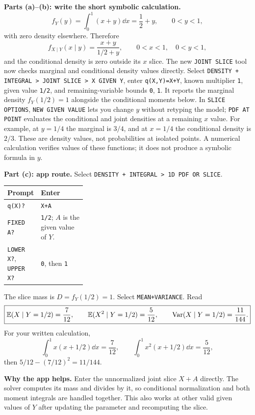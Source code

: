 \textbf{Parts (a)--(b): write the short symbolic calculation.}
\[
f_Y(y)=\int_0^1(x+y)\dd x=\frac12+y,\qquad 0<y<1,
\]
with zero density elsewhere. Therefore
\[
f_{X\mid Y}(x\mid y)=\frac{x+y}{1/2+y},\qquad 0<x<1,\quad 0<y<1,
\]
and the conditional density is zero outside its $x$ slice. The new \texttt{JOINT SLICE} tool now checks marginal and conditional density values directly. Select \texttt{DENSITY + INTEGRAL > JOINT SLICE > X GIVEN Y}, enter \texttt{q(X,Y)=X+Y}, known multiplier \texttt{1}, given value \texttt{1/2}, and remaining-variable bounds \texttt{0}, \texttt{1}. It reports the marginal density $f_Y(1/2)=1$ alongside the conditional moments below. In \texttt{SLICE OPTIONS}, \texttt{NEW GIVEN VALUE} lets you change $y$ without retyping the model; \texttt{PDF AT POINT} evaluates the conditional and joint densities at a remaining $x$ value. For example, at $y=1/4$ the marginal is $3/4$, and at $x=1/4$ the conditional density is $2/3$. These are density values, not probabilities at isolated points. A numerical calculation verifies values of these functions; it does not produce a symbolic formula in $y$.

\textbf{Part (c): app route.} Select \texttt{DENSITY + INTEGRAL > 1D PDF OR SLICE}.
\begin{center}
\begin{tabularx}{\linewidth}{@{}p{0.32\linewidth}X@{}}
\toprule Prompt & Enter\\\midrule
\texttt{q(X)?} & \texttt{X+A}\\
\texttt{FIXED A?} & \texttt{1/2}; $A$ is the given value of $Y$.\\
\texttt{LOWER X?}, \texttt{UPPER X?} & \texttt{0}, then \texttt{1}\\\bottomrule
\end{tabularx}
\end{center}
The slice mass is $D=f_Y(1/2)=1$. Select \texttt{MEAN+VARIANCE}. Read
\[
\boxed{\mathbb E(X\mid Y=1/2)=\frac7{12},\qquad
\mathbb E(X^2\mid Y=1/2)=\frac5{12},\qquad
\operatorname{Var}(X\mid Y=1/2)=\frac{11}{144}.}
\]
For your written calculation,
\[
\int_0^1x(x+1/2)\dd x=\frac7{12},\qquad
\int_0^1x^2(x+1/2)\dd x=\frac5{12},
\]
then $5/12-(7/12)^2=11/144$.

\textbf{Why the app helps.} Enter the unnormalized joint slice $X+A$ directly. The solver computes its mass and divides by it, so conditional normalization and both moment integrals are handled together. This also works at other valid given values of $Y$ after updating the parameter and recomputing the slice.


